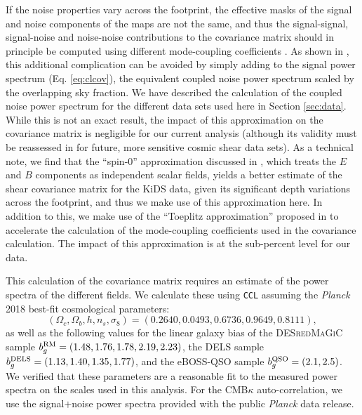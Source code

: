 \documentclass[a4paper,11pt]{article}
\newcommand{\cmbk}{CMB$\kappa$\xspace}
\newcommand{\ccl}{\texttt{CCL}\xspace}
\newcommand{\des}{DES\xspace}
\newcommand{\kids}{KiDS\xspace}
\newcommand{\planck}{{\sl Planck}\xspace}
\newcommand{\eboss}{eBOSS-QSO\xspace}
\newcommand{\redmagic}{\textsc{redMaGiC}\xspace}
\newcommand{\dls}{DELS\xspace}
\begin{document}
      If the noise properties vary across the footprint, the effective masks of the signal and noise components of the maps are not the same, and thus the signal-signal, signal-noise and noise-noise contributions to the covariance matrix should in principle be computed using different mode-coupling coefficients \cite{1811.05714}. As shown in \cite{2010.09717}, this additional complication can be avoided by simply adding to the signal power spectrum (Eq. \ref{eq:clcov}), the equivalent coupled noise power spectrum scaled by the overlapping sky fraction. We have described the calculation of the coupled noise power spectrum for the different data sets used here in Section \ref{sec:data}. While this is not an exact result, the impact of this approximation on the covariance matrix is negligible for our current analysis (although its validity must be reassessed in for future, more sensitive cosmic shear data sets). As a technical note, we find that the ``spin-0'' approximation discussed in \cite{1906.11765}, which treats the $E$ and $B$ components as independent scalar fields, yields a better estimate of the shear covariance matrix for the \kids data, given its significant depth variations across the footprint, and thus we make use of this approximation here. In addition to this, we make use of the ``Toeplitz approximation'' proposed in \cite{2010.14344} to accelerate the calculation of the mode-coupling coefficients used in the covariance calculation. The impact of this approximation is at the sub-percent level for our data.

      This calculation of the covariance matrix requires an estimate of the power spectra of the different fields. We calculate these using \ccl assuming the \planck 2018 best-fit cosmological parameters:
      \begin{equation}\label{eq:fiducial}
        (\Omega_c,\Omega_b,h,n_s,\sigma_8)=(0.2640,0.0493,0.6736,0.9649,0.8111),
      \end{equation}
      as well as the following values for the linear galaxy bias of the \des \redmagic sample $b_g^{\rm RM}=(1.48,1.76,1.78,2.19,2.23)$, the \dls sample $b_g^{\rm DELS}=(1.13,1.40,1.35,1.77)$, and the \eboss sample $b_g^{\rm QSO}=(2.1,2.5)$. We verified that these parameters are a reasonable fit to the measured power spectra on the scales used in this analysis. For the \cmbk auto-correlation, we use the signal$+$noise power spectra provided with the public \planck data release.
    
\end{document}
